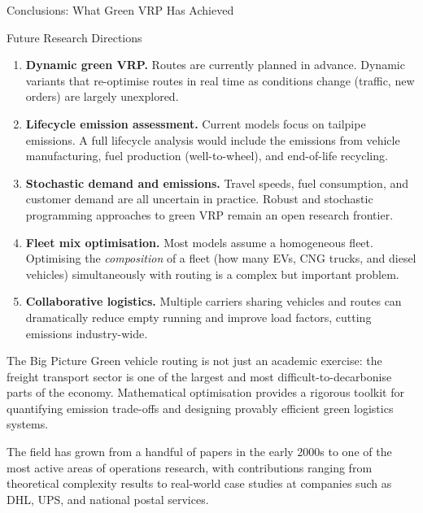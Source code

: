 \documentclass[aspectratio=169,10pt]{beamer}
\begin{document}
\begin{frame}[allowframebreaks]{Conclusions: What Green VRP Has Achieved}
\begin{block}{Future Research Directions}
\begin{enumerate}
      \item \textbf{Dynamic green VRP.}  Routes are currently planned in
      advance.  Dynamic variants that re-optimise routes in real time as
      conditions change (traffic, new orders) are largely unexplored.

      \item \textbf{Lifecycle emission assessment.}  Current models focus on
      tailpipe emissions.  A full lifecycle analysis would include the
      emissions from vehicle manufacturing, fuel production (well-to-wheel),
      and end-of-life recycling.

      \item \textbf{Stochastic demand and emissions.}  Travel speeds, fuel
      consumption, and customer demand are all uncertain in practice.  Robust
      and stochastic programming approaches to green VRP remain an open
      research frontier.

      \item \textbf{Fleet mix optimisation.}  Most models assume a homogeneous
      fleet.  Optimising the \emph{composition} of a fleet (how many EVs,
      CNG trucks, and diesel vehicles) simultaneously with routing is a
      complex but important problem.

      \item \textbf{Collaborative logistics.}  Multiple carriers sharing
      vehicles and routes can dramatically reduce empty running and improve
      load factors, cutting emissions industry-wide.
    \end{enumerate}
  \end{block}

  \framebreak

  \begin{alertblock}{The Big Picture}
    Green vehicle routing is not just an academic exercise: the freight
    transport sector is one of the largest and most difficult-to-decarbonise
    parts of the economy.  Mathematical optimisation provides a rigorous
    toolkit for quantifying emission trade-offs and designing provably
    efficient green logistics systems.

    The field has grown from a handful of papers in the early 2000s to one
    of the most active areas of operations research, with contributions
    ranging from theoretical complexity results to real-world case studies
    at companies such as DHL, UPS, and national postal services.
  \end{alertblock}

\end{frame}
\end{document}
